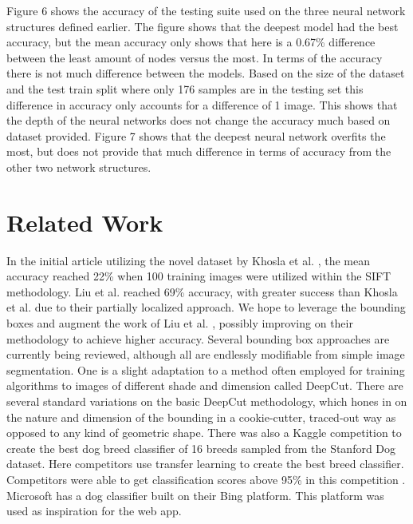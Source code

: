 \documentclass[12pt]{article}
\begin{document}
Figure 6 shows the accuracy of the testing suite used on the three neural network structures defined earlier.  The figure shows that the deepest model had the best accuracy, but the mean accuracy only shows that here is a 0.67\% difference between the least amount of nodes versus the most.  In terms of the accuracy there is not much difference between the models.  Based on the size of the dataset and the test train split where only 176 samples are in the testing set this difference in accuracy only accounts for a difference of 1 image. This shows that the depth of the neural networks does not change the accuracy much based on dataset provided.  Figure 7 shows that the deepest neural network overfits the most, but does not provide that much difference in terms of accuracy from the other two network structures.



\section{Related Work}

In the initial article utilizing the novel dataset by Khosla et al. \cite{khosla2011novel}, the mean accuracy reached 22\% when 100 training images were utilized within the SIFT methodology. Liu et al. \cite{liu2012dog} reached 69\% accuracy, with greater success than Khosla et al. \cite{khosla2011novel} due to their partially localized approach. We hope to leverage the bounding boxes and augment the work of Liu et al. \cite{liu2012dog}, possibly improving on their methodology to achieve higher accuracy. Several bounding box approaches are currently being reviewed, although all are endlessly modifiable from simple image segmentation. One is a slight adaptation to a method often employed for training algorithms to images of different shade and dimension called DeepCut. \cite{rajchl2016deepcut} There are several standard variations on the basic DeepCut methodology, which hones in on the nature and dimension of the bounding in a cookie-cutter, traced-out way as opposed to any kind of geometric shape. There was also a Kaggle competition to create the best dog breed classifier of 16 breeds sampled from the Stanford Dog dataset. Here competitors use transfer learning to create the best breed classifier. Competitors were able to get classification scores above 95\% in this competition \cite{kaggledogs}. Microsoft has a dog classifier built on their Bing platform. This platform was used as inspiration for the web app.
\end{document}
